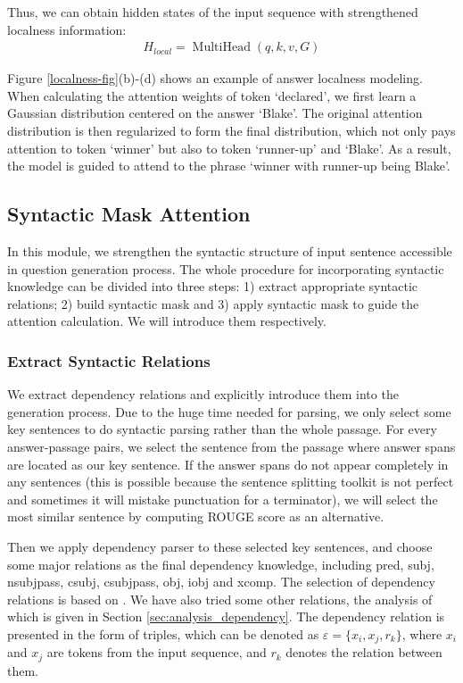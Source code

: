 \documentclass[11pt]{article}
\begin{document}
Thus, we can obtain hidden states of the input sequence with strengthened localness information:
\begin{align}
    H_{local} = \operatorname{MultiHead}(q,k,v,G)
\end{align}

Figure \ref{localness-fig}(b)-(d) shows an example of answer localness modeling. When calculating the attention weights of token `declared', we first learn a Gaussian distribution centered on the answer `Blake'. The original attention distribution is then regularized to form the final distribution, which not only pays attention to token `winner' but also to token `runner-up' and `Blake'. As a result, the model is guided to attend to the phrase `winner with runner-up being Blake'. 

\subsection{Syntactic Mask Attention}
In this module, we strengthen the syntactic structure of input sentence accessible in question generation process.
The whole procedure for incorporating syntactic knowledge can be divided into three steps: 1) extract appropriate syntactic relations; 2) build syntactic mask and 3) apply syntactic mask to guide the attention calculation. We will introduce them respectively.


\subsubsection{Extract Syntactic Relations} \label{section-extract-relation}
We extract dependency relations and explicitly introduce them into the generation process. Due to the huge time needed for parsing, we only select some key sentences to do syntactic parsing rather than the whole passage. For every answer-passage pairs, we select the sentence from the passage where answer spans are located as our key sentence. If the answer spans do not appear completely in any sentences (this is possible because the sentence splitting toolkit is not perfect and sometimes it will mistake punctuation for a terminator), we will select the most similar sentence by computing ROUGE score as an alternative.

Then we apply dependency parser to these selected key sentences, and choose some major relations as the final dependency knowledge, including pred, subj, nsubjpass, csubj, csubjpass, obj, iobj and xcomp. The selection of dependency relations is based on \citet{de-marneffe-etal-2014-universal}. We have also tried some other relations, the analysis of which is given in Section \ref{sec:analysis_dependency}.
The dependency relation is presented in the form of triples, which can be denoted as $\varepsilon = \{x_i, x_j, r_k\}$, where $x_i$ and $x_j$ are tokens from the input sequence, and $r_k$ denotes the relation between them. 
\end{document}
